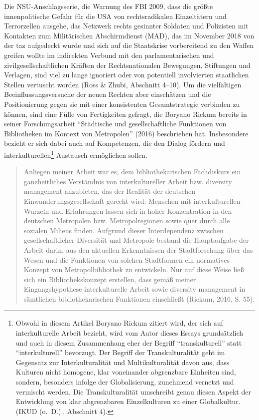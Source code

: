 \documentclass[a4paper,
fontsize=11pt,
oneside,
numbers=noperiodatend,
parskip=half-,
bibliography=totoc,
final
]{scrartcl}
\begin{document}
Die NSU-Anschlagsserie, die Warnung des FBI 2009, dass die größte
innenpolitische Gefahr für die USA von rechtsradikalen Einzeltätern und
Terrorzellen ausgehe, das Netzwerk rechts gesinnter Soldaten und
Polizisten mit Kontakten zum Militärischen Abschirmdienst (MAD), das im
November 2018 von der taz aufgedeckt wurde und sich auf die Staatskrise
vorbereitend zu den Waffen greifen wollte im indirekten Verbund mit den
parlamentarischen und zivilgesellschaftlichen Kräften der
Rechtsnationalen Bewegungen, Stiftungen und Verlagen, sind viel zu lange
ignoriert oder von potentiell involvierten staatlichen Stellen vertuscht
worden (Ross \& Zhubi, Abschnitt 4--10). Um die vielfältigen
Beeinflussungsversuche der neuen Rechten aber einschätzen und die
Positionierung gegen sie mit einer konsistenten Gesamtstrategie
verbinden zu können, sind eine Fülle von Fertigkeiten gefragt, die
Boryano Rickum bereits in seiner Forschungsarbeit \enquote{Städtische
und gesellschaftliche Funktionen von Bibliotheken im Kontext von
Metropolen} (2016) beschrieben hat. Insbesondere bezieht er sich dabei
auch auf Kompetenzen, die den Dialog fördern und
interkulturellen\footnote{Obwohl in diesem Artikel Boryano Rickum
  zitiert wird, der sich auf interkulturelle Arbeit bezieht, wird vom
  Autor dieses Essays grundsätzlich und auch in diesem Zusammenhang eher
  der Begriff \enquote{transkulturell} statt \enquote{interkulturell}
  bevorzugt. Der Begriff der Transkulturalität geht im Gegensatz zur
  Interkulturalität und Multikulturalität davon aus, dass Kulturen nicht
  homogene, klar voneinander abgrenzbare Einheiten sind, sondern,
  besonders infolge der Globalisierung, zunehmend vernetzt und vermischt
  werden. Die Transkulturalität umschreibt genau diesen Aspekt der
  Entwicklung von klar abgrenzbaren Einzelkulturen zu einer
  Globalkultur. (IKUD (o.~D.)., Abschnitt 4).} Austausch ermöglichen
sollen.

\begin{quote}
Anliegen meiner Arbeit war es, dem bibliothekarischen Fachdiskurs ein
ganzheitliches Verständnis von interkultureller Arbeit bzw. diversity
management anzubieten, das der Realität der deutschen
Einwanderungsgesellschaft gerecht wird: Menschen mit interkulturellen
Wurzeln und Erfahrungen lassen sich in hoher Konzentration in den
deutschen Metropolen bzw. Metropolregionen sowie quer durch alle
sozialen Milieus finden. Aufgrund dieser Interdependenz zwischen
gesellschaftlicher Diversität und Metropole bestand die Hauptaufgabe der
Arbeit darin, aus den aktuellen Erkenntnissen der Stadtforschung über
das Wesen und die Funktionen von solchen Stadtformen ein normatives
Konzept von Metropolbibliothek zu entwickeln. Nur auf diese Weise ließ
sich ein Bibliothekskonzept erstellen, dass gemäß meiner
Eingangshypothese interkulturelle Arbeit sowie diversity management in
sämtlichen bibliothekarischen Funktionen einschließt (Rickum, 2016, S.
55).
\end{quote}
\end{document}
